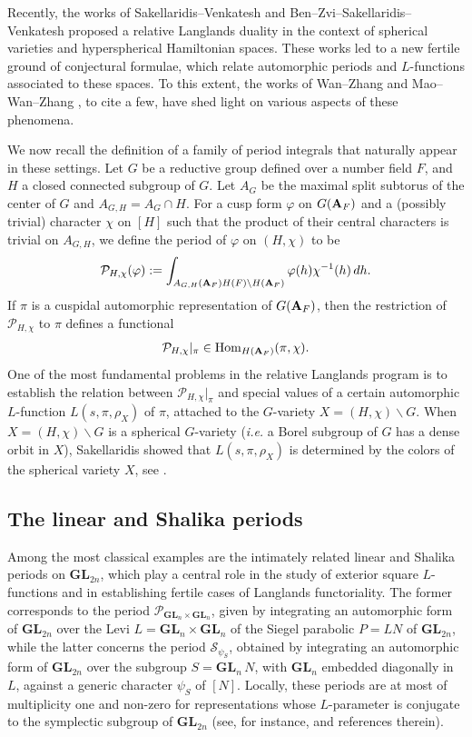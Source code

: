 \documentclass[11pt, reqno]{amsart}
\theoremstyle{plain}
\theoremstyle{definition}
\theoremstyle{remark}
\theoremstyle{plain}
\def\A{{\bf A}}
\def\GL{\mathbf{GL}}
\begin{document}
Recently, the works of Sakellaridis--Venkatesh \cite{SakellaridisVenkatesh} and Ben--Zvi--Sakellaridis--Venkatesh \cite{BZSV} proposed a relative Langlands duality in the context of spherical varieties and hyperspherical Hamiltonian spaces. These works led to a new fertile ground of conjectural formulae, which relate automorphic periods and $L$-functions associated to these spaces. 
To this extent, the works of Wan--Zhang \cite{Wan:Zhang:Spherical:Periods} and Mao--Wan--Zhang \cite{MWZ}, to cite a few, have shed light on various aspects of these phenomena.

We now recall the definition of a family of period integrals that naturally appear in these settings. Let $G$ be a reductive group defined over a number field $F$, and $H$ a closed connected subgroup of $G$. 
Let $A_G$ be the maximal split subtorus of the center of $G$ and $A_{G,H} = A_G \cap H$. For a cusp form $\varphi$ on $G(\A_F)$ and a (possibly trivial) character $\chi$ on $[H]$ such that the product of their central characters is trivial on $A_{G,H}$, we define the period of $\varphi$ on $(H,\chi)$ to be
\[ \mathcal{P}_{H,\chi}( \varphi) := \int_{A_{G,H}(\A_F)H(F)\setminus H(\A_F)} \varphi(h) \chi^{-1}(h)\,dh. \] If $\pi$ is a cuspidal automorphic representation of $G(\A_F)$, then the restriction of $\mathcal{P}_{H,\chi}$ to $\pi$ defines a functional \begin{align*}\mathcal{P}_{H,\chi}|_{\pi} \in {\rm Hom}_{H(\A_F)}(\pi, \chi). \end{align*}
One of the most fundamental problems in the relative Langlands program is to establish the relation between $\mathcal{P}_{H,\chi}|_{\pi}$ and special values of a certain automorphic $L$-function $L(s,\pi,\rho_{X})$ of $\pi$, attached to the $G$-variety $X=(H,\chi) \backslash G$. When $X=(H,\chi) \backslash G$ is a spherical $G$-variety (\textit{i.e.} a Borel subgroup of $G$ has a dense orbit in $X$), Sakellaridis showed that $L(s,\pi,\rho_X)$ is determined by the colors of the spherical variety $X$, see \cite{sakellaridis2013spherical}.

\subsection{The linear and Shalika periods}
Among the most classical examples are the intimately related linear and Shalika periods on $\GL_{2n}$, which play a central role in the study of exterior square $L$-functions and in establishing fertile cases of Langlands functoriality. The former corresponds to the period $\mathcal{P}_{\GL_n \times \GL_n}$, given by integrating an automorphic form of $\GL_{2n}$ over the Levi $L=\GL_n \times \GL_n$ of the Siegel parabolic $P=LN$  of $\GL_{2n}$, while the latter concerns the period $\mathcal{S}_{\psi_S}$, obtained by integrating an automorphic form of $\GL_{2n}$ over the subgroup $S=\GL_n\, N$, with $\GL_n$ embedded diagonally in $L$,  against a generic character $\psi_S$ of $[N]$.
Locally, these periods are at most of multiplicity one and non-zero for representations whose $L$-parameter is conjugate to the symplectic subgroup of $\GL_{2n}$ (see, for instance, \cite[Theorem 1.1]{Chen-Gan} and references therein). 
\end{document}
